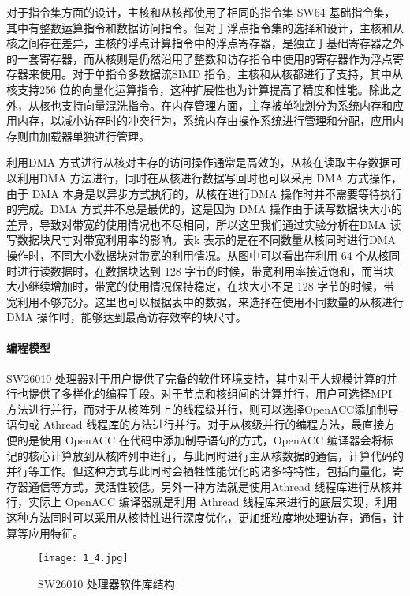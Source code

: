 对于指令集方面的设计，主核和从核都使用了相同的指令集 SW64 基础指令集，其中有整数运算指令和数据访问指令。但对于浮点指令集的选择和设计，主核和从核之间存在差异，主核的浮点计算指令中的浮点寄存器，是独立于基础寄存器之外的一套寄存器，而从核则是仍然沿用了整数和访存指令中使用的寄存器作为浮点寄存器来使用。对于单指令多数据流SIMD 指令，主核和从核都进行了支持，其中从核支持256 位的向量化运算指令，这种扩展性也为计算提高了精度和性能。除此之外，从核也支持向量混洗指令。在内存管理方面，主存被单独划分为系统内存和应用内存，以减小访存时的冲突行为，系统内存由操作系统进行管理和分配，应用内存则由加载器单独进行管理。

利用DMA 方式进行从核对主存的访问操作通常是高效的，从核在读取主存数据可以利用DMA 方法进行，同时在从核进行数据写回时也可以采用 DMA 方式操作，由于 DMA 本身是以异步方式执行的，从核在进行DMA 操作时并不需要等待执行的完成。DMA 方式并不总是最优的，这是因为 DMA 操作由于读写数据块大小的差异，导致对带宽的使用情况也不尽相同，所以这里我们通过实验分析在DMA 读写数据块尺寸对带宽利用率的影响。表k 表示的是在不同数量从核同时进行DMA 操作时，不同大小数据块对带宽的利用情况。从图中可以看出在利用 64 个从核同时进行读数据时，在数据块达到 128 字节的时候，带宽利用率接近饱和，而当块大小继续增加时，带宽的使用情况保持稳定，在块大小不足 128 字节的时候，带宽利用不够充分。这里也可以根据表中的数据，来选择在使用不同数量的从核进行 DMA 操作时，能够达到最高访存效率的块尺寸。

\paragraph{编程模型}
SW26010 处理器对于用户提供了完备的软件环境支持，其中对于大规模计算的并行也提供了多样化的编程手段。对于节点和核组间的计算并行，用户可选择MPI 方法进行并行，而对于从核阵列上的线程级并行，则可以选择OpenACC添加制导语句或 Athread 线程库的方法进行并行。对于从核级并行的编程方法，最直接方便的是使用 OpenACC 在代码中添加制导语句的方式，OpenACC 编译器会将标记的核心计算放到从核阵列中进行，与此同时进行主从核数据的通信，计算代码的并行等工作。但这种方式与此同时会牺牲性能优化的诸多特特性，包括向量化，寄存器通信等方式，灵活性较低。另外一种方法就是使用Athread 线程库进行从核并行，实际上 OpenACC 编译器就是利用 Athread 线程库来进行的底层实现，利用这种方法同时可以采用从核特性进行深度优化，更加细粒度地处理访存，通信，计算等应用特征。

 \begin{figure}[h]
  \centering
  \texttt{[image: 1\_4.jpg]}
  \caption{SW26010 处理器软件库结构}
  \label{fig:badge}
\end{figure}

